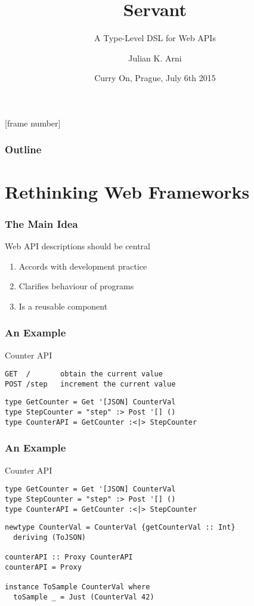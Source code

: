 \documentclass{beamer}
\title{Servant}
\subtitle{A Type-Level DSL for Web APIs}
\author{Julian K. Arni}
\date{Curry On, Prague, July 6th 2015}
\begin{document}
\frame{\titlepage}

[frame number]
\begin{frame}
\frametitle{Outline}
\tableofcontents[]
\end{frame}

\section{Rethinking Web Frameworks}

\begin{frame}
\frametitle{The Main Idea}
\pause
\begin{tcolorbox}
Web API descriptions should be central
\end{tcolorbox}
\pause
\begin{enumerate}
\item Accords with development practice \pause
\item Clarifies behaviour of programs \pause
\item Is a reusable component
\end{enumerate}
\end{frame}

\begin{frame}[fragile]
\frametitle{An Example}
\begin{tcolorbox}{Counter API}
\begin{verbatim}
GET  /       obtain the current value
POST /step   increment the current value
\end{verbatim}
\end{tcolorbox}
\pause
\begin{verbatim}
type GetCounter = Get '[JSON] CounterVal
type StepCounter = "step" :> Post '[] ()
type CounterAPI = GetCounter :<|> StepCounter
\end{verbatim}
\end{frame}

\begin{frame}[fragile]
\frametitle{An Example}
\pause
\begin{tcolorbox}{Counter API}
\begin{verbatim}
type GetCounter = Get '[JSON] CounterVal
type StepCounter = "step" :> Post '[] ()
type CounterAPI = GetCounter :<|> StepCounter
\end{verbatim}
\end{tcolorbox}
\pause
\begin{verbatim}
newtype CounterVal = CounterVal {getCounterVal :: Int}
  deriving (ToJSON)

counterAPI :: Proxy CounterAPI
counterAPI = Proxy

instance ToSample CounterVal where
  toSample _ = Just (CounterVal 42)
\end{verbatim}
\end{frame}
\end{document}
